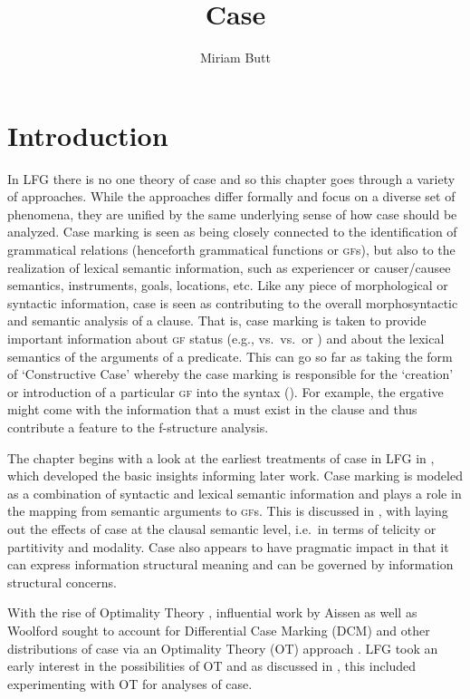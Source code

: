 \documentclass[output=paper,hidelinks]{langscibook}
\title{Case}
\author{Miriam Butt\affiliation{University of Konstanz}}
\begin{document}
\maketitle
\label{chap:Case}

\section{Introduction}

In LFG there is no one theory of case and so this chapter goes through a variety
of approaches.  While the approaches differ formally 
and focus on  a diverse set of phenomena, they are unified by the same
underlying sense of how  case should be analyzed. Case marking is seen as being closely
connected to the identification of grammatical relations (henceforth grammatical
functions or \textsc{gf}s), but also to the realization of lexical semantic information,
such as experiencer or causer/causee semantics, instruments, goals, locations,
etc. Like any piece of morphological or syntactic information, case is
seen as contributing  to the overall morphosyntactic and semantic
analysis of a clause.  That is, case marking is taken to provide important
information about \textsc{gf} status (e.g., \SUBJ vs.~\OBJ vs.~\OBJTHETA or \OBLTHETA) and
about the lexical semantics of the arguments of a predicate.  This can go so far
as taking the form of `Constructive Case' whereby the case marking is
responsible for the `creation' or introduction of a particular \textsc{gf} into the
syntax ().  For example, the ergative might come with the information that a \SUBJ
must exist in the clause and thus contribute a \SUBJ feature to the f-structure
analysis. 

The chapter begins with a look at the earliest treatments of case in LFG in
, which developed the basic insights informing later
work.  Case marking is modeled as a combination of syntactic and lexical
semantic information and  plays a role in the mapping from semantic
arguments to \textsc{gf}s. This is discussed in , with
 laying out the effects of case at the clausal semantic level,
i.e.~in terms of telicity or partitivity  and 
modality.  Case also appears to have pragmatic impact in that it can express
information structural meaning and can be governed by information structural
concerns. 

With the rise of Optimality Theory \citep{PrinceSmolensky1993}, influential work
by Aissen as well as Woolford sought to account for Differential Case Marking
(DCM) and other distributions of case via an Optimality Theory (OT) approach
\citep{Aissen1999,Aissen2003,Woolford2001}.  LFG took an early interest in the
possibilities of OT \citep{bresnan00opt} and as discussed in , this included  
experimenting with OT for analyses of case. 
\end{document}
